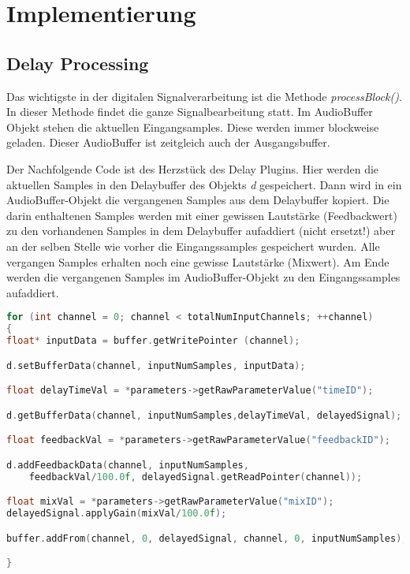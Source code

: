 \chapter{Implementierung}



\section{Delay Processing}

Das wichtigste in der digitalen Signalverarbeitung ist die Methode \textit{processBlock()}. In dieser Methode findet die ganze Signalbearbeitung statt. Im AudioBuffer Objekt stehen die aktuellen Eingangsamples. Diese werden immer blockweise geladen. Dieser AudioBuffer ist zeitgleich auch der Ausgangsbuffer.

Der Nachfolgende Code ist des Herzstück des Delay Plugins. Hier werden die aktuellen Samples in den Delaybuffer des Objekts \textit{d} gespeichert. Dann wird in ein AudioBuffer-Objekt die vergangenen Samples aus dem Delaybuffer kopiert. Die darin enthaltenen Samples werden mit einer gewissen Lautstärke (Feedbackwert) zu den vorhandenen Samples in dem Delaybuffer aufaddiert (nicht ersetzt!) aber an der selben Stelle wie vorher die Eingangssamples gespeichert wurden. Alle vergangen Samples erhalten noch eine gewisse Lautstärke (Mixwert). Am Ende werden die vergangenen Samples im AudioBuffer-Objekt zu den Eingangssamples aufaddiert.

\begin{lstlisting}[language=C++, caption=Ausschnitt aus processBlock()]
for (int channel = 0; channel < totalNumInputChannels; ++channel)
{
float* inputData = buffer.getWritePointer (channel);

d.setBufferData(channel, inputNumSamples, inputData);

float delayTimeVal = *parameters->getRawParameterValue("timeID");

d.getBufferData(channel, inputNumSamples,delayTimeVal, delayedSignal);

float feedbackVal = *parameters->getRawParameterValue("feedbackID");

d.addFeedbackData(channel, inputNumSamples,
	feedbackVal/100.0f, delayedSignal.getReadPointer(channel));

float mixVal = *parameters->getRawParameterValue("mixID");
delayedSignal.applyGain(mixVal/100.0f);

buffer.addFrom(channel, 0, delayedSignal, channel, 0, inputNumSamples);

}
\end{lstlisting}

